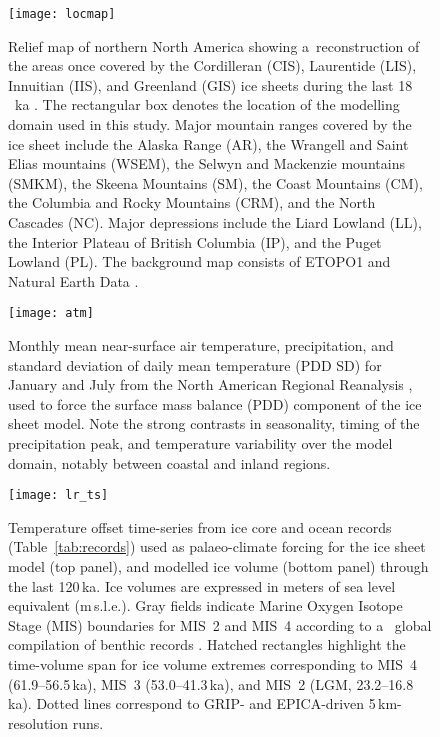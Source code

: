 \documentclass[tc, manuscript]{copernicus}
\begin{document}
\begin{figure}
  \texttt{[image: locmap]}
  \caption{Relief map of northern North America showing a~reconstruction of the
           areas once covered by the Cordilleran (CIS), Laurentide (LIS),
           Innuitian (IIS), and Greenland (GIS) ice sheets during the last
           18\,\unit{\,ka} \citep[21.4\,cal\,ka,][]{Dyke.2004}.
           The rectangular box denotes the location of the
           modelling domain used in this study. Major mountain ranges covered
           by the ice sheet include the Alaska Range (AR), the Wrangell and
           Saint Elias mountains (WSEM), the Selwyn and Mackenzie mountains
           (SMKM), the Skeena Mountains (SM), the Coast Mountains (CM), the
           Columbia and Rocky
           Mountains (CRM), and the North Cascades (NC). Major depressions
           include the Liard Lowland (LL), the Interior Plateau of British
           Columbia (IP), and the Puget Lowland (PL). The background
           map consists of ETOPO1 \citep{Amante.Eakins.2009} and Natural Earth
           Data \citep{Patterson.Kelso.2015}.}
  \label{fig:locmap}
\end{figure}

\begin{figure}
  \texttt{[image: atm]}
  \caption{Monthly mean near-surface air temperature, precipitation, and
           standard deviation of daily mean temperature (PDD SD) for January
           and July from the North American Regional Reanalysis
           \citep[NARR;][]{Mesinger.etal.2006}, used to force the surface mass
           balance (PDD) component of the ice sheet model. Note the
           strong contrasts in seasonality, timing of the precipitation peak,
           and temperature variability over the model domain, notably between
           coastal and inland regions.}
  \label{fig:atm}
\end{figure}

\begin{figure*}
  \texttt{[image: lr\_ts]}
  \caption{Temperature offset time-series from ice core and ocean records
           (Table~\ref{tab:records}) used as palaeo-climate forcing for the ice
           sheet model (top panel), and modelled ice volume (bottom panel)
           through the last 120\,\unit{ka}. Ice volumes are expressed in meters of sea
           level equivalent (\unit{m}\,s.l.e.). Gray fields indicate Marine Oxygen
           Isotope Stage (MIS) boundaries for MIS~2 and MIS~4 according to
      a~     global compilation of benthic  records
           \citep{Lisiecki.Raymo.2005}. Hatched rectangles highlight the
           time-volume span for ice volume extremes corresponding to MIS~4
           (61.9--56.5\,\unit{ka}), MIS~3 (53.0--41.3\,\unit{ka}), and MIS~2 (LGM,
           23.2--16.8\,\unit{ka}). Dotted lines correspond to GRIP- and EPICA-driven
           5\,\unit{km}-resolution runs.}
  \label{fig:lr_ts}
\end{figure*}
\end{document}
